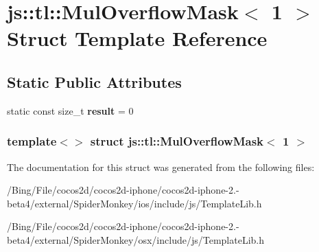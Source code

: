 \hypertarget{structjs_1_1tl_1_1_mul_overflow_mask_3_011_01_4}{\section{js\-:\-:tl\-:\-:Mul\-Overflow\-Mask$<$ 1 $>$ Struct Template Reference}
\label{structjs_1_1tl_1_1_mul_overflow_mask_3_011_01_4}
}
\subsection*{Static Public Attributes}
\begin{DoxyCompactItemize}
\item 
\hypertarget{structjs_1_1tl_1_1_mul_overflow_mask_3_011_01_4_a43e54293d87bd5e5d83e735c382a49ea}{static const size\-\_\-t {\bfseries result} = 0}\label{structjs_1_1tl_1_1_mul_overflow_mask_3_011_01_4_a43e54293d87bd5e5d83e735c382a49ea}

\end{DoxyCompactItemize}
\subsubsection*{template$<$$>$ struct js\-::tl\-::\-Mul\-Overflow\-Mask$<$ 1 $>$}



The documentation for this struct was generated from the following files\-:\begin{DoxyCompactItemize}
\item 
/\-Bing/\-File/cocos2d/cocos2d-\/iphone/cocos2d-\/iphone-\/2.-\/beta4/external/\-Spider\-Monkey/ios/include/js/Template\-Lib.\-h\item 
/\-Bing/\-File/cocos2d/cocos2d-\/iphone/cocos2d-\/iphone-\/2.-\/beta4/external/\-Spider\-Monkey/osx/include/js/Template\-Lib.\-h\end{DoxyCompactItemize}
